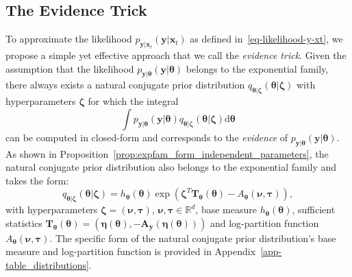 \subsection{The Evidence Trick}
To approximate the likelihood $p_{\mathbf{y} \vert \mathbf{x}_t}(\mathbf{y} \vert \mathbf{x}_t)$ as defined in~\eqref{eq-likelihood-y-xt}, we propose a simple yet effective approach that we call the \textit{evidence trick}. Given the assumption that the likelihood $p_{\mathbf{y}|\boldsymbol{\theta}}(\mathbf{y}|\boldsymbol{\theta})$ belongs to the exponential family, there always exists a natural conjugate prior distribution $q_{\boldsymbol{\theta}|\boldsymbol{\zeta}}(\boldsymbol{\theta}|\boldsymbol{\zeta})$ with hyperparameters $\boldsymbol{\zeta}$ for which the integral
\begin{equation*}
\int p_{\mathbf{y}|\boldsymbol{\theta}}(\mathbf{y}|\boldsymbol{\theta}) q_{\boldsymbol{\theta}|\boldsymbol{\zeta}}(\boldsymbol{\theta}|\boldsymbol{\zeta}) \mathrm{d}\boldsymbol{\theta} 
\end{equation*}
can be computed in closed-form and corresponds to the \textit{evidence} of $p_{\mathbf{y}|\boldsymbol{\theta}}(\mathbf{y}|\boldsymbol{\theta})$.
As shown in Proposition~\ref{prop:expfam_form_independent_parameters}, the natural conjugate prior distribution also belongs to the exponential family and takes the form:
\begin{equation}
\label{eq-prior-q-theta}
q_{\boldsymbol{\theta}|\boldsymbol{\zeta}}(\boldsymbol{\theta}|\boldsymbol{\zeta}) = h_{\boldsymbol{\theta}}(\boldsymbol{\theta}) \exp \left(\boldsymbol{\zeta}^T \mathbf{T}_{\boldsymbol{\theta}}(\boldsymbol{\theta}) - A_{\boldsymbol{\theta}}(\boldsymbol{\nu},  \boldsymbol{\tau}) \right),
\end{equation}
with hyperparameters $\boldsymbol{\zeta} = \left(\boldsymbol{\nu} ,\boldsymbol{\tau}\right)$, $\boldsymbol{\nu}, \boldsymbol{\tau}  \in \mathbb{R}^d$, base measure $h_{\boldsymbol{\theta}}(\boldsymbol{\theta})$, sufficient statistics $\mathbf{T}_{\boldsymbol{\theta}}(\boldsymbol{\theta}) = (\boldsymbol{\eta}(\boldsymbol{\theta}), -\mathbf{A}_{\boldsymbol{y}}(\boldsymbol{\eta}(\boldsymbol{\theta})))$ and log-partition function $A_{\boldsymbol{\theta}}(\boldsymbol{\nu},  \boldsymbol{\tau})$. The specific form of the natural conjugate prior distribution's base measure and log-partition function is provided in Appendix~\ref{app-table_distributions}.

